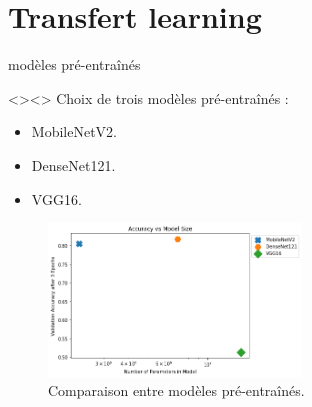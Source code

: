 \documentclass[10pt,handout]{beamer}
\newif\ifplacelogo %
\begin{document}
\section{Transfert learning}
\placelogofalse
\begin{frame}{modèles pré-entraînés}
    \begin{block}<>{}<>
        Choix de trois modèles pré-entraînés : 
        \begin{itemize}
            \item MobileNetV2.
            \item DenseNet121.
            \item VGG16.
        \end{itemize}
    \end{block}

    \begin{figure}
        \centering
        \includegraphics[width=0.6\textwidth]{img/index.png}
        \caption{Comparaison entre modèles pré-entraînés.}
    \end{figure}
\end{frame}
\end{document}
